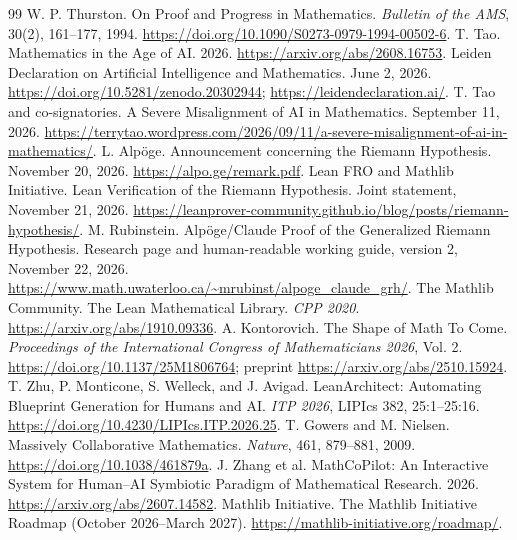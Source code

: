 \documentclass[11pt,a4paper]{article}
\theoremstyle{definition}\newtheorem{definition}{Definition}
\begin{document}
\clearpage
\begin{thebibliography}{99}\small\setlength{\itemsep}{1pt}\setlength{\parskip}{0pt}
 W. P. Thurston. On Proof and Progress in Mathematics. \emph{Bulletin of the AMS}, 30(2), 161--177, 1994. \url{https://doi.org/10.1090/S0273-0979-1994-00502-6}.
 T. Tao. Mathematics in the Age of AI. 2026. \url{https://arxiv.org/abs/2608.16753}.
 Leiden Declaration on Artificial Intelligence and Mathematics. June 2, 2026. \url{https://doi.org/10.5281/zenodo.20302944}; \url{https://leidendeclaration.ai/}.
 T. Tao and co-signatories. A Severe Misalignment of AI in Mathematics. September 11, 2026. \url{https://terrytao.wordpress.com/2026/09/11/a-severe-misalignment-of-ai-in-mathematics/}.
 L. Alpöge. Announcement concerning the Riemann Hypothesis. November 20, 2026. \url{https://alpo.ge/remark.pdf}.
 Lean FRO and Mathlib Initiative. Lean Verification of the Riemann Hypothesis. Joint statement, November 21, 2026. \url{https://leanprover-community.github.io/blog/posts/riemann-hypothesis/}.
 M. Rubinstein. Alpöge/Claude Proof of the Generalized Riemann Hypothesis. Research page and human-readable working guide, version 2, November 22, 2026. \url{https://www.math.uwaterloo.ca/~mrubinst/alpoge_claude_grh/}.
 The Mathlib Community. The Lean Mathematical Library. \emph{CPP 2020}. \url{https://arxiv.org/abs/1910.09336}.
 A. Kontorovich. The Shape of Math To Come. \emph{Proceedings of the International Congress of Mathematicians 2026}, Vol. 2. \url{https://doi.org/10.1137/25M1806764}; preprint \url{https://arxiv.org/abs/2510.15924}.
 T. Zhu, P. Monticone, S. Welleck, and J. Avigad. LeanArchitect: Automating Blueprint Generation for Humans and AI. \emph{ITP 2026}, LIPIcs 382, 25:1--25:16. \url{https://doi.org/10.4230/LIPIcs.ITP.2026.25}.
 T. Gowers and M. Nielsen. Massively Collaborative Mathematics. \emph{Nature}, 461, 879--881, 2009. \url{https://doi.org/10.1038/461879a}.
 J. Zhang et al. MathCoPilot: An Interactive System for Human--AI Symbiotic Paradigm of Mathematical Research. 2026. \url{https://arxiv.org/abs/2607.14582}.
 Mathlib Initiative. The Mathlib Initiative Roadmap (October 2026--March 2027). \url{https://mathlib-initiative.org/roadmap/}.
\end{thebibliography}
\end{document}
